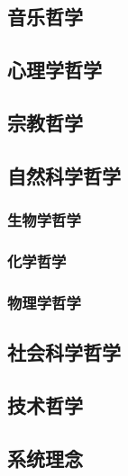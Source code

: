 \documentclass[UTF8]{../RepresentationUniverse}
\begin{document}
    \subsection{音乐哲学}
    \subsection{心理学哲学}
    \subsection{宗教哲学}
    \subsection{自然科学哲学}
    \subsubsection{生物学哲学}
    \subsubsection{化学哲学}
    \subsubsection{物理学哲学}
    \subsection{社会科学哲学}
    \subsection{技术哲学}
    \subsection{系统理念}
\end{document}
